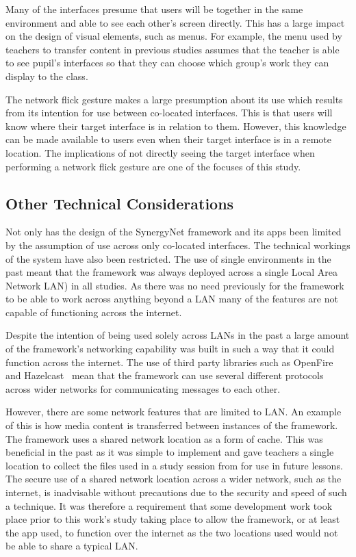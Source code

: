 \documentclass[a4paper,11pt]{article}
\begin{document}
Many of the interfaces presume that users will be together in the same environment and able to see each other's screen directly.
This has a large impact on the design of visual elements, such as menus.
For example, the menu used by teachers to transfer content in previous studies assumes that the teacher is able to see pupil's interfaces so that they can choose which group's work they can display to the class.

The network flick gesture makes a large presumption about its use which results from its intention for use between co-located interfaces.
This is that users will know where their target interface is in relation to them.
However, this knowledge can be made available to users even when their target interface is in a remote location.
The implications of not directly seeing the target interface when performing a network flick gesture are one of the focuses of this study.

\subsection{Other Technical Considerations}

Not only has the design of the SynergyNet framework and its apps been limited by the assumption of use across only co-located interfaces.
The technical workings of the system have also been restricted.
The use of single environments in the past meant that the framework was always deployed across a single Local Area Network LAN) in all studies.
As there was no need previously for the framework to be able to work across anything beyond a LAN many of the features are not capable of functioning across the internet.

Despite the intention of being used solely across LANs in the past a large amount of the framework's networking capability was built in such a way that it could function across the internet.
The use of third party libraries such as OpenFire~\cite{igniterealtime:2016} and Hazelcast~\cite{hazelcast:2016} mean that the framework can use several different protocols across wider networks for communicating messages to each other.


However, there are some network features that are limited to LAN.
An example of this is how media content is transferred between instances of the framework.
The framework uses a shared network location as a form of cache.
This was beneficial in the past as it was simple to implement and gave teachers a single location to collect the files used in a study session from for use in future lessons.
The secure use of a shared network location across a wider network, such as the internet, is inadvisable without precautions due to the security and speed of such a technique.
It was therefore a requirement that some development work took place prior to this work's study taking place to allow the framework, or at least the app used, to function over the internet as the two locations used would not be able to share a typical LAN.
\end{document}
